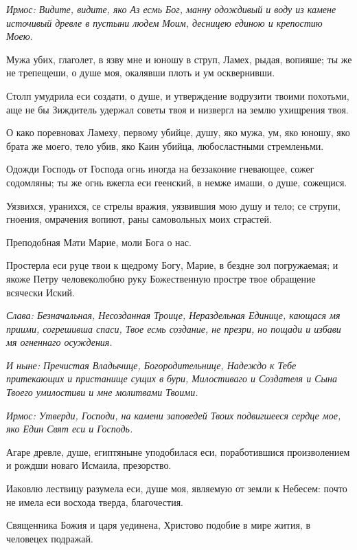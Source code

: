 \itshape Ирмос\normalfont{}: Видите, видите, яко Аз есмь Бог, манну одождивый и воду из камене источивый древле в пустыни людем Моим, десницею единою и крепостию Моею. 

Мужа убих, глаголет, в язву мне и юношу в струп, Ламех, рыдая, вопияше; ты же не трепещеши, о душе моя, окалявши плоть и ум осквернивши. 

Столп умудрила еси создати, о душе, и утверждение водрузити твоими похотьми, аще не бы Зиждитель удержал советы твоя и низвергл на землю ухищрения твоя. 

О како поревновах Ламеху, первому убийце, душу, яко мужа, ум, яко юношу, яко брата же моего, тело убив, яко Каин убийца, любосластными стремленьми. 

Одожди Господь от Господа огнь иногда на беззаконие гневающее, сожег содомляны; ты же огнь вжегла еси геенский, в немже имаши, о душе, сожещися. 

Уязвихся, уранихся, се стрелы вражия, уязвившия мою душу и тело; се струпи, гноения, омрачения вопиют, раны самовольных моих страстей. 

\bfseries 

Преподобная Мати Марие, моли Бога о нас.

\normalfont{}

Простерла еси руце твои к щедрому Богу, Марие, в бездне зол погружаемая; и якоже Петру человеколюбно руку Божественную простре твое обращение всячески Иский. 

\itshape Слава\normalfont{}: Безначальная, Несозданная Троице, Нераздельная Единице, кающася мя приими, согрешивша спаси, Твое есмь создание, не презри, но пощади и избави мя огненнаго осуждения. 

\itshape И ныне\normalfont{}: Пречистая Владычице, Богородительнице, Надеждо к Тебе притекающих и пристанище сущих в бури, Милостиваго и Создателя и Сына Твоего умилостиви и мне молитвами Твоими.



\itshape Ирмос\normalfont{}: Утверди, Господи, на камени заповедей Твоих подвигшееся сердце мое, яко Един Свят еси и Господь. 

Агаре древле, душе, египтяныне уподобилася еси, поработившися произволением и рождши новаго Исмаила, презорство. 

Иаковлю лествицу разумела еси, душе моя, являемую от земли к Небесем: почто не имела еси восхода тверда, благочестия. 

Священника Божия и царя уединена, Христово подобие в мире жития, в человецех подражай. 

